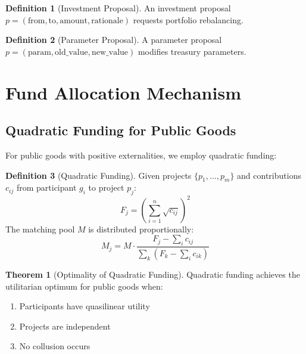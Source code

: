 \documentclass[11pt,a4paper]{article}
\theoremstyle{definition}
\newtheorem{definition}{Definition}[section]
\newtheorem{theorem}{Theorem}[section]
\theoremstyle{remark}
\begin{document}
\begin{definition}[Investment Proposal]
An investment proposal $p = (\text{from}, \text{to}, \text{amount}, \text{rationale})$ requests portfolio rebalancing.
\end{definition}

\begin{definition}[Parameter Proposal]
A parameter proposal $p = (\text{param}, \text{old\_value}, \text{new\_value})$ modifies treasury parameters.
\end{definition}

\section{Fund Allocation Mechanism}

\subsection{Quadratic Funding for Public Goods}

For public goods with positive externalities, we employ quadratic funding:

\begin{definition}[Quadratic Funding]
Given projects $\{p_1, \ldots, p_m\}$ and contributions $c_{ij}$ from participant $g_i$ to project $p_j$:
\begin{equation}
    F_j = \left( \sum_{i=1}^{n} \sqrt{c_{ij}} \right)^2
\end{equation}
The matching pool $M$ is distributed proportionally:
\begin{equation}
    M_j = M \cdot \frac{F_j - \sum_i c_{ij}}{\sum_k (F_k - \sum_i c_{ik})}
\end{equation}
\end{definition}

\begin{theorem}[Optimality of Quadratic Funding]
Quadratic funding achieves the utilitarian optimum for public goods when:
\begin{enumerate}
    \item Participants have quasilinear utility
    \item Projects are independent
    \item No collusion occurs
\end{enumerate}
\end{theorem}
\end{document}
